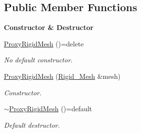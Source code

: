 \subsection*{Public Member Functions}
\begin{Indent}{\bf Constructor \& Destructor}\par
\begin{DoxyCompactItemize}
\item 
\hyperlink{classFVCode3D_1_1ProxyRigidMesh_abc89ae7f9cc7c58592468b62e4b67272}{Proxy\+Rigid\+Mesh} ()=delete
\begin{DoxyCompactList}\small\item\em No default constructor. \end{DoxyCompactList}\item 
\hyperlink{classFVCode3D_1_1ProxyRigidMesh_a5140e02265f8ea4873979ebf93cd6f42}{Proxy\+Rigid\+Mesh} (\hyperlink{classFVCode3D_1_1Rigid__Mesh}{Rigid\+\_\+\+Mesh} \&mesh)
\begin{DoxyCompactList}\small\item\em Constructor. \end{DoxyCompactList}\item 
\hyperlink{classFVCode3D_1_1ProxyRigidMesh_a744bc3b662fa445ed0c08e530f289a49}{$\sim$\+Proxy\+Rigid\+Mesh} ()=default
\begin{DoxyCompactList}\small\item\em Default destructor. \end{DoxyCompactList}\end{DoxyCompactItemize}
\end{Indent}
